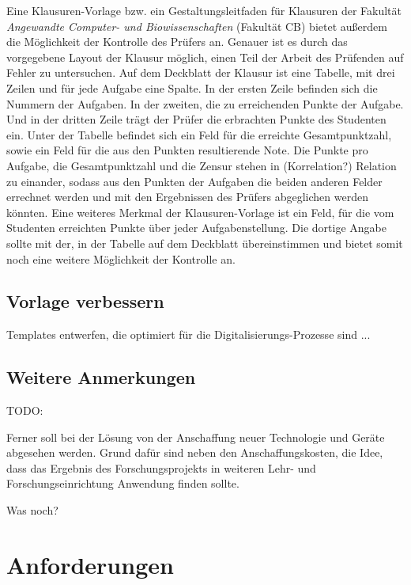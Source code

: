 \documentclass[nomenclature, 150]{HSMW-Thesis}
\begin{document}
	Eine Klausuren-Vorlage bzw. ein Gestaltungsleitfaden für Klausuren der Fakultät \textit{Angewandte Computer- und Biowissenschaften} (Fakultät CB) bietet außerdem die Möglichkeit der Kontrolle des Prüfers an. Genauer ist es durch das vorgegebene Layout der Klausur möglich, einen Teil der Arbeit des Prüfenden auf Fehler zu untersuchen. Auf dem Deckblatt der Klausur ist eine Tabelle, mit drei Zeilen und für jede Aufgabe eine Spalte. In der ersten Zeile befinden sich die Nummern der Aufgaben. In der zweiten, die zu erreichenden Punkte der Aufgabe. Und in der dritten Zeile trägt der Prüfer die erbrachten Punkte des Studenten ein. Unter der Tabelle befindet sich ein Feld für die erreichte Gesamtpunktzahl, sowie ein Feld für die aus den Punkten resultierende Note. Die Punkte pro Aufgabe, die Gesamtpunktzahl und die Zensur stehen in (Korrelation?) Relation zu einander, sodass aus den Punkten der Aufgaben die beiden anderen Felder errechnet werden und mit den Ergebnissen des Prüfers abgeglichen werden könnten. Eine weiteres Merkmal der Klausuren-Vorlage ist ein Feld, für die vom Studenten erreichten Punkte über jeder Aufgabenstellung. Die dortige Angabe sollte mit der, in der Tabelle auf dem Deckblatt übereinstimmen und bietet somit noch eine weitere Möglichkeit der Kontrolle an.
	
	\section{Vorlage verbessern}
	
	
	Templates entwerfen, die optimiert für die Digitalisierungs-Prozesse sind ... 
	
	\section{Weitere Anmerkungen}
	TODO:
	
	Ferner soll bei der Lösung von der Anschaffung neuer Technologie und Geräte abgesehen werden. Grund dafür sind neben den Anschaffungskosten, die Idee, dass das Ergebnis des Forschungsprojekts in weiteren Lehr- und Forschungseinrichtung Anwendung finden sollte.
			
	Was noch?



\chapter{Anforderungen}
\end{document}
